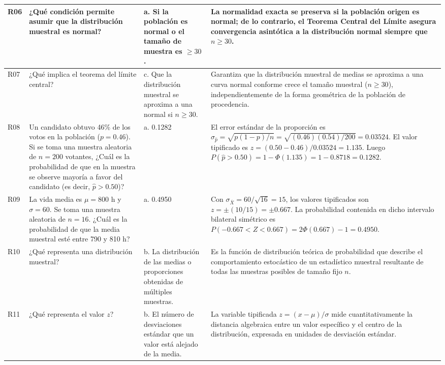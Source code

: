 {\begin{center}
\begin{longtable}{p{1.2cm}p{4.3cm}p{3.8cm}p{5.3cm}}
R06 & ¿Qué condición permite asumir que la distribución muestral es normal? & a. Si la población es normal o el tamaño de muestra es $\ge 30$. & La normalidad exacta se preserva si la población origen es normal; de lo contrario, el Teorema Central del Límite asegura convergencia asintótica a la distribución normal siempre que $n \ge 30$. \citep{anderson2012,wackerly2010} \\\hline
R07 & ¿Qué implica el teorema del límite central? & c. Que la distribución muestral se aproxima a una normal si $n \ge 30$. & Garantiza que la distribución muestral de medias se aproxima a una curva normal conforme crece el tamaño muestral ($n \ge 30$), independientemente de la forma geométrica de la población de procedencia. \citep{anderson2012,lind2012} \\\hline
R08 & Un candidato obtuvo 46\% de los votos en la población ($p = 0.46$). Si se toma una muestra aleatoria de $n = 200$ votantes, ¿Cuál es la probabilidad de que en la muestra se observe mayoría a favor del candidato (es decir, $\hat{p} > 0.50$)? & a. 0.1282 & El error estándar de la proporción es $\sigma_{\hat{p}} = \sqrt{p(1-p)/n} = \sqrt{(0.46)(0.54)/200} = 0.03524$. El valor tipificado es $z = (0.50 - 0.46)/0.03524 = 1.135$. Luego $P(\hat{p} > 0.50) = 1 - \Phi(1.135) = 1 - 0.8718 = 0.1282$. \citep{anderson2012,lind2012} \\\hline
R09 & La vida media es $\mu = 800$ h y $\sigma = 60$. Se toma una muestra aleatoria de $n = 16$. ¿Cuál es la probabilidad de que la media muestral esté entre 790 y 810 h? & a. 0.4950 & Con $\sigma_{\bar{X}} = 60 / \sqrt{16} = 15$, los valores tipificados son $z = \pm (10/15) = \pm 0.667$. La probabilidad contenida en dicho intervalo bilateral simétrico es $P(-0.667 < Z < 0.667) = 2\Phi(0.667) - 1 = 0.4950$. \citep{anderson2012,canavos1988} \\\hline
R10 & ¿Qué representa una distribución muestral? & b. La distribución de las medias o proporciones obtenidas de múltiples muestras. & Es la función de distribución teórica de probabilidad que describe el comportamiento estocástico de un estadístico muestral resultante de todas las muestras posibles de tamaño fijo $n$. \citep{anderson2012,wackerly2010} \\\hline
R11 & ¿Qué representa el valor $z$? & b. El número de desviaciones estándar que un valor está alejado de la media. & La variable tipificada $z = (x - \mu)/\sigma$ mide cuantitativamente la distancia algebraica entre un valor específico y el centro de la distribución, expresada en unidades de desviación estándar. \citep{anderson2012,lind2012} \\\hline

\end{longtable}
\end{center}}
